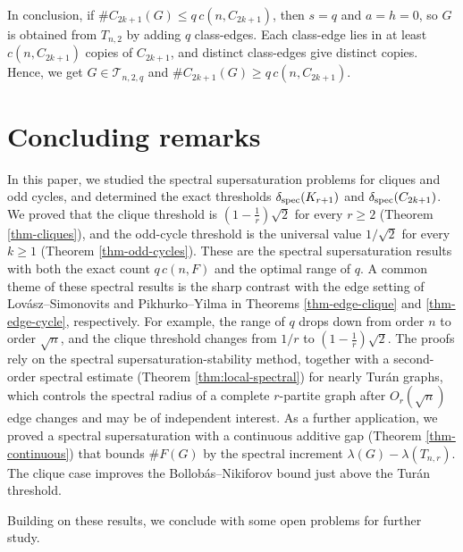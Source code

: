 \documentclass[11pt,a4paper]{article}
\theoremstyle{definition}
\theoremstyle{plain}
\renewcommand{\le}{\leqslant}
\renewcommand{\ge}{\geqslant}
\begin{document}
In conclusion, if $\texttt{\#}C_{2k+1}(G)\le
q\,c(n,C_{2k+1})$, then $s=q$ and $a=h=0$, so $G$ is
obtained from $T_{n,2}$ by adding $q$ class-edges.
Each class-edge lies in at least $c(n,C_{2k+1})$
 copies of $C_{2k+1}$, and distinct
class-edges give distinct copies. Hence, we get $G\in\mathcal T_{n,2,q}$ and 
$\texttt{\#}C_{2k+1}(G)\ge q\,c(n,C_{2k+1})$. 








\section{Concluding remarks}

\label{sec-concluding-remark}

In this paper, we studied the 
spectral supersaturation problems for cliques and
odd cycles, and determined the exact thresholds $\delta_{\rm spec}(K_{r+1})$ and
$\delta_{\rm spec}(C_{2k+1})$. 
We proved that the clique threshold is
$(1-\frac1r)\sqrt2$ for every $r\ge 2$ (Theorem \ref{thm-cliques}), and the odd-cycle threshold is the
universal value $1/\sqrt2$ for every $k\ge 1$ (Theorem
\ref{thm-odd-cycles}). These are the spectral supersaturation results with both the exact count $q\,c(n,F)$ and the optimal range of $q$. 
A common theme of
these spectral results is the sharp contrast with the edge setting of Lov\'asz--Simonovits and Pikhurko--Yilma in Theorems \ref{thm-edge-clique} and \ref{thm-edge-cycle}, respectively. For example,
 the range of $q$ drops down from order $n$ to order $\sqrt n$, and the clique threshold changes from
$1/r$ to $(1 \!-\! \frac1r)\sqrt2$. 
The proofs rely on the spectral supersaturation-stability method, together with a second-order spectral estimate (Theorem \ref{thm:local-spectral})  for nearly Tur\'an graphs, which controls the spectral radius of a complete $r$-partite graph after $O_r(\sqrt n)$ edge changes and may be of independent interest. As a further application, we proved a spectral supersaturation with a continuous additive gap (Theorem \ref{thm-continuous}) that bounds $\texttt{\#}F(G)$ by
the spectral increment $\lambda(G)-\lambda(T_{n,r})$. The clique case improves the
Bollob\'as--Nikiforov bound just above the Tur\'an threshold. 


\smallskip 
Building on these results, we conclude with some open problems for further study.
\end{document}
